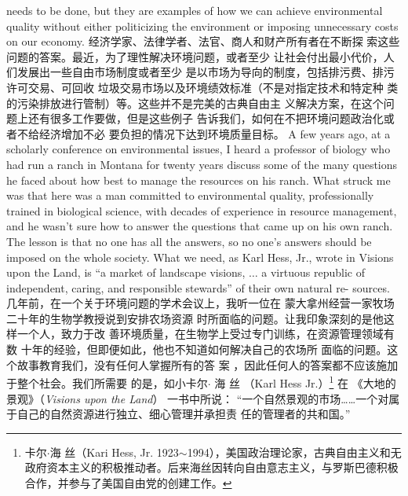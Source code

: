 \begin{paracol}{2}
needs to be done, but they are examples of how we can achieve
environmental quality without either politicizing the environment or imposing unnecessary costs on our economy.
\switchcolumn
经济学家、法律学者、法官、商人和财产所有者在不断探
索这些问题的答案。最近，为了理性解决环境问题，或者至少
让社会付出最小代价，人们发展出一些自由市场制度或者至少
是以市场为导向的制度，包括排污费、排污许可交易、可回收
垃圾交易市场以及环境绩效标准（不是对指定技术和特定种
类的污染排放进行管制）等。这些并不是完美的古典自由主
义解决方案，在这个问题上还有很多工作要做，但是这些例子
告诉我们，如何在不把环境问题政治化或者不给经济增加不必
要负担的情况下达到环境质量目标。
\switchcolumn*
A few years ago, at a scholarly conference on environmental
issues, I heard a professor of biology who had run a ranch in
Montana for twenty years discuss some of the many questions
he faced about how best to manage the resources on his ranch.
What struck me was that here was a man committed to environmental quality, professionally trained in biological science,
with decades of experience in resource management, and he
wasn't sure how to answer the questions that came up on his
own ranch. The lesson is that no one has all the answers, so no
one's answers should be imposed on the whole society. What we
need, as Karl Hess, Jr., wrote in Visions upon the Land, is ``a market of landscape visions, $\ldots$ a virtuous republic of independent,
caring, and responsible stewards'' of their own natural re-
sources.
\switchcolumn
几年前，在一个关于环境问题的学术会议上，我听一位在
蒙大拿州经营一家牧场二十年的生物学教授说到安排农场资源
时所面临的问题。让我印象深刻的是他这样一个人，致力于改
善环境质量，在生物学上受过专门训练，在资源管理领域有数
十年的经验，但即便如此，他也不知道如何解决自己的农场所
面临的问题。这个故事教育我们，没有任何人掌握所有的答
案 ，因此任何人的答案都不应该施加于整个社会。我们所需要
的是，如小卡尔$\cdot$ 海 丝 （Karl  Hess Jr.）\footnote{卡尔$\cdot$海 丝（Kari Hess, Jr. 1923$\sim$1994），美国政治理论家，古典自由主义和无政府资本主义的积极推动者。后来海丝因转向自由意志主义，与罗斯巴德积极合作，并参与了美国自由党的创建工作。} 在 《大地的景观》（\textit{Visions upon the Land}） 一书中所说： “一个自然景观的市场……一个对属于自己的自然资源进行独立、细心管理并承担责
任的管理者的共和国。”


\end{paracol}

